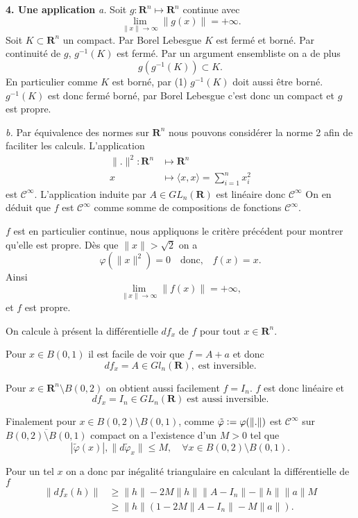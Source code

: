 \documentclass[12pt]{article}
\newcommand{\defeq}{\vcentcolon=}
\newcommand{\R}{\mathbf{R}}
\begin{document}
\textbf{4. Une application} \textit{a.} Soit $g : \R^{n} \longmapsto \R^{n}$ continue avec  
\begin{equation}
        \lim_{\|x\|\to \infty}\|g(x)\| = +\infty.
\end{equation}
Soit $K \subset \R^{n}$ un compact. Par Borel Lebesgue $K$ est fermé et borné. Par continuité de $g$, $g^{-1}(K)$ est fermé. Par un argument ensembliste on a de plus \[
g(g^{-1}(K)) \subset K
.\] En particulier comme $K$ est borné, par (1) $g^{-1}(K)$ doit aussi être borné. $g^{-1}(K)$ est donc fermé borné, par Borel Lebesgue c'est donc un compact et $g$ est propre. 

\medskip

\textit{b.} Par équivalence des normes sur $\R^{n}$ nous pouvons considérer la norme 2 afin de faciliter les calculs. L'application
\begin{align*}
        \|.\|^{2} : \R^{n} &\longmapsto \R^{n} \\
        x &\longmapsto \langle x, x \rangle = \sum_{i=1}^{n}x_{i}^{2}
\end{align*} est $\mathcal{C}^{\infty}$. L'application induite par $A \in GL_{n}(\R)$ est linéaire donc $\mathcal{C}^{\infty}$ On en déduit que $f$ est $\mathcal{C}^{\infty}$ comme somme de compositions de fonctions $\mathcal{C}^{\infty}$.


$f$ est en particulier continue, nous appliquons le critère précédent pour montrer qu'elle est propre. Dès que $\|x\| > \sqrt{2}$ on a \[
        \varphi(\|x\|^{2}) = 0 \quad \text{donc,} \quad f(x) = x
.\] Ainsi \[
\lim_{\|x\|\to \infty}\|f(x)\| = +\infty
,\] et $f$ est propre. 

On calcule à présent la différentielle $df_{x}$ de $f$ pour tout $x \in \R^{n}$. 

Pour $x \in B(0,1)$ il est facile de voir que $f = A + a$ et donc  \[
        df_{x} = A \in Gl_{n}(\R), \; \text{est inversible}
.\]

Pour $x \in \R^{n}\setminus B(0,2)$ on obtient aussi facilement $f = I_{n}$. $f$ est donc linéaire et  \[
        df_{x} = I_{n} \in GL_{n}(\R) \; \text{est aussi inversible}
.\] 

Finalement pour $x \in B(0,2)\setminus B(0,1)$, comme $\tilde{\varphi} \defeq \varphi(\|.\|)$ est $\mathcal{C}^{\infty}$ sur $\overline{B(0,2)\setminus B(0,1)}$ compact on a l'existence d'un $M > 0$ tel que \[
        |\tilde{\varphi}(x)|, \|d\tilde{\varphi}_{x}\| \le M, \quad \forall x \in B(0,2)\setminus B(0,1)
.\]  

Pour un tel $x$ on a donc par inégalité triangulaire en calculant la différentielle de $f$ 
\begin{align*}
        \|df_{x}(h)\| &\ge \|h\| - 2M\|h\|\|A-I_{n}\| - \|h\|\|a\|M \\
                      &\ge \|h\|(1-2M\|A-I_{n}\|-M\|a\|) 
.\end{align*}
\end{document}
